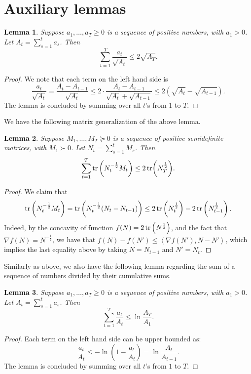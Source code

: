 \documentclass{article}
\newtheorem{lemma}{Lemma}
\newcommand{\inner}[2]{\left\langle #1,#2 \right\rangle}
\begin{document}



\appendix

\section{Auxiliary lemmas}

\begin{lemma}
Suppose $a_1, \ldots, a_T \geq 0$ is a sequence of positive numbers, with $a_1 > 0$. Let $A_t = \sum_{s=1}^t a_s$. Then
\[ \sum_{t=1}^T \frac{a_t}{\sqrt{A_t}} \leq 2\sqrt{A_T}. \]
\label{lem:sca-sqrt}
\end{lemma}
\begin{proof}
We note that each term on the left hand side is
\[ \frac{a_t}{\sqrt{A_t}} = \frac{A_t - A_{t-1}}{\sqrt{A_t}} \leq 2 \cdot \frac{A_t - A_{t-1}}{\sqrt{A_t} + \sqrt{A_{t-1}}} \leq 2(\sqrt{A_t} - \sqrt{A_{t-1}}). \]
The lemma is concluded by summing over all $t$'s from $1$ to $T$.
\end{proof}

We have the following matrix generalization of the above lemma.
\begin{lemma}
  Suppose $M_1, \ldots, M_T \succeq 0$ is a sequence of positive semidefinite matrices, with $M_1 \succ 0$. Let $N_t = \sum_{s=1}^t M_s$. Then
  \[ \sum_{t=1}^T \tr\del{N_t^{-\frac12} M_t} \leq 2\tr(N_T^{\frac12}). \]
  \label{lem:mat-sqrt}
\end{lemma}
\begin{proof}
We claim that
\[ \tr\del{N_t^{-\frac12} M_t} = \tr\del{N_t^{-\frac12} (N_t - N_{t-1})} \leq 2\tr\del{N_t^{\frac12}} - 2\tr\del{N_{t-1}^\frac12}. \]
Indeed, by the concavity of function $f(N) = 2\tr\del{N^{\frac12}}$, and the fact that
$\nabla f(N) = N^{-\frac12}$, we have that $f(N) - f(N') \leq \inner{\nabla f(N')}{N - N'}$, which implies the last equality above by taking $N = N_{t-1}$ and $N' = N_t$.
\end{proof}

Similarly as above, we also have the following lemma regarding the sum of a sequence of
numbers divided by their cumulative sums.

\begin{lemma}
Suppose $a_1, \ldots, a_T \geq 0$ is a sequence of positive numbers, with $a_1 > 0$. Let $A_t = \sum_{s=1}^t a_s$. Then
\[ \sum_{t=1}^T \frac{a_t}{A_t} \leq \ln \frac{A_T}{A_1}. \]
\label{lem:sca-ln}
\end{lemma}
\begin{proof}
Each term on the left hand side can be upper bounded as:
\[ \frac{a_t}{A_t} \leq -\ln(1-\frac{a_t}{A_t}) = \ln\frac{A_t}{A_{t-1}}. \]
The lemma is concluded by summing over all $t$'s from $1$ to $T$.
\end{proof}
\end{document}
